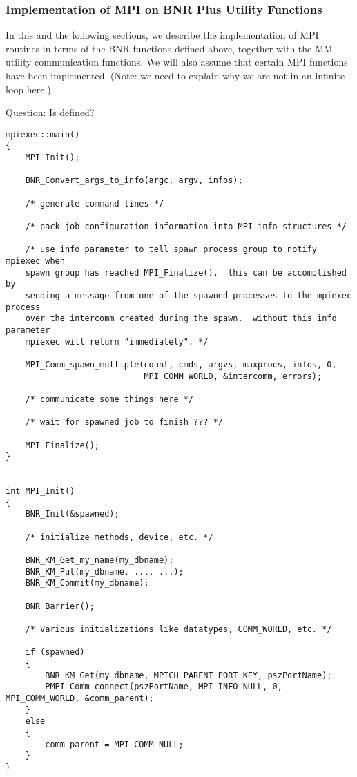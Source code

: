 \documentclass{article}
\begin{document}
\subsubsection{Implementation of MPI on BNR Plus Utility Functions}

In this and the following sections, we describe the implementation of MPI
routines in terms of the BNR functions defined above, together with the
MM utility communication functions.  We will also assume that certain
MPI functions have been implemented.  (Note:  we need to explain why we are
not in an infinite loop here.)

Question: Is  defined?

\begin{small}
\begin{verbatim}
mpiexec::main()
{
    MPI_Init();

    BNR_Convert_args_to_info(argc, argv, infos);
    
    /* generate command lines */

    /* pack job configuration information into MPI info structures */

    /* use info parameter to tell spawn process group to notify mpiexec when
    spawn group has reached MPI_Finalize().  this can be accomplished by
    sending a message from one of the spawned processes to the mpiexec process
    over the intercomm created during the spawn.  without this info parameter
    mpiexec will return "immediately". */
    
    MPI_Comm_spawn_multiple(count, cmds, argvs, maxprocs, infos, 0,
                            MPI_COMM_WORLD, &intercomm, errors);

    /* communicate some things here */

    /* wait for spawned job to finish ??? */

    MPI_Finalize();
}


int MPI_Init()
{
    BNR_Init(&spawned);

    /* initialize methods, device, etc. */
    
    BNR_KM_Get_my_name(my_dbname);
    BNR_KM_Put(my_dbname, ..., ...);
    BNR_KM_Commit(my_dbname);

    BNR_Barrier();
    
    /* Various initializations like datatypes, COMM_WORLD, etc. */

    if (spawned)
    {
        BNR_KM_Get(my_dbname, MPICH_PARENT_PORT_KEY, pszPortName);
        PMPI_Comm_connect(pszPortName, MPI_INFO_NULL, 0, MPI_COMM_WORLD, &comm_parent);
    }
    else
    {
        comm_parent = MPI_COMM_NULL;
    }
}


\end{verbatim}
\end{small}
\end{document}

